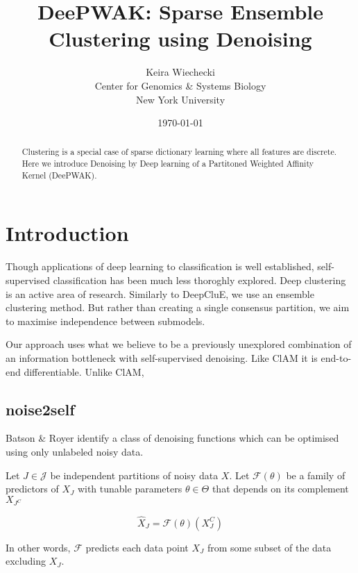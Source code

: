 \documentclass{article}
\date{\today}
\title{DeePWAK: Sparse Ensemble Clustering using Denoising}
\author{Keira Wiechecki \\
  Center for Genomics \& Systems Biology \\
  New York University \\
}
\begin{document}
\maketitle

\begin{abstract}
  Clustering is a special case of sparse dictionary learning where all features are discrete.
Here we introduce Denoising by Deep learning of a Partitoned Weighted Affinity Kernel (DeePWAK). 
\end{abstract}

\section{Introduction}
Though applications of deep learning to classification is well established, self-supervised classification has been much less thoroghly explored.
Deep clustering is an active area of research\cite{ren2022deep}.
Similarly to DeepCluE\cite{huang2023deepclue}, we use an ensemble clustering method.
But rather than creating a single consensus partition, we aim to maximise independence between submodels.

Our approach uses what we believe to be a previously unexplored combination of an information bottleneck with self-supervised denoising.
Like ClAM\cite{saha2023endtoend} it is end-to-end differentiable.
Unlike ClAM,

\subsection{noise2self}

Batson \& Royer\cite{batson2019noise2self} identify a class of denoising functions which can be optimised using only unlabeled noisy data.

Let $J \in \mathcal{J}$ be independent partitions of noisy data $X$. Let $\mathcal{F}(\theta)$ be a family of predictors of $X_J$ with tunable parameters $\theta \in \Theta$ that depends on its complement $X_{J^C}$

\begin{equation}
  \hat{X}_J=\mathcal{F}(\theta)(X_J^C)
\end{equation}

In other words, $\mathcal{F}$ predicts each data point $X_J$ from some subset of the data excluding $X_J$. 
\end{document}
